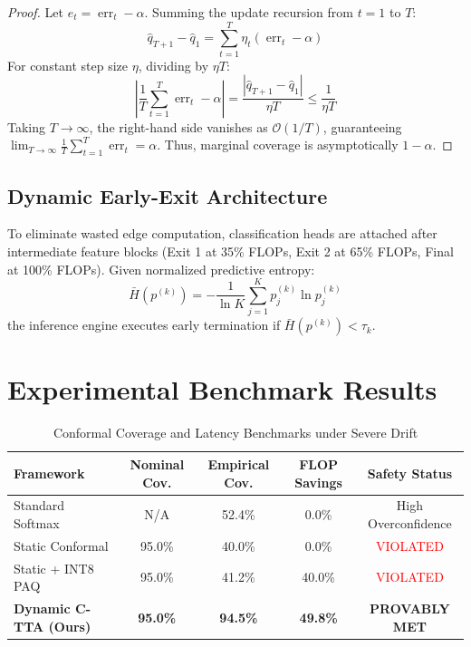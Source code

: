 \documentclass[journal,twocolumn,letterpaper]{IEEEtran}
\begin{document}
\begin{proof}
Let $e_t = \operatorname{err}_t - \alpha$. Summing the update recursion from $t=1$ to $T$:
\begin{equation}
\hat{q}_{T+1} - \hat{q}_1 = \sum_{t=1}^T \eta_t (\operatorname{err}_t - \alpha)
\end{equation}
For constant step size $\eta$, dividing by $\eta T$:
\begin{equation}
\left| \frac{1}{T} \sum_{t=1}^T \operatorname{err}_t - \alpha \right| = \frac{|\hat{q}_{T+1} - \hat{q}_1|}{\eta T} \le \frac{1}{\eta T}
\end{equation}
Taking $T \to \infty$, the right-hand side vanishes as $\mathcal{O}(1/T)$, guaranteeing $\lim_{T\to\infty} \frac{1}{T}\sum_{t=1}^T \operatorname{err}_t = \alpha$. Thus, marginal coverage is asymptotically $1 - \alpha$.
\end{proof}

\subsection{Dynamic Early-Exit Architecture}
To eliminate wasted edge computation, classification heads are attached after intermediate feature blocks (Exit 1 at 35\% FLOPs, Exit 2 at 65\% FLOPs, Final at 100\% FLOPs). Given normalized predictive entropy:
\begin{equation}
\bar{H}(p^{(k)}) = -\frac{1}{\ln K} \sum_{j=1}^K p_j^{(k)} \ln p_j^{(k)}
\end{equation}
the inference engine executes early termination if $\bar{H}(p^{(k)}) < \tau_k$.

\section{Experimental Benchmark Results}

\begin{table}[t]
\centering
\caption{Conformal Coverage and Latency Benchmarks under Severe Drift}
\label{tab:conformal_results}
\begin{tabular}{lcccc}
\toprule
\textbf{Framework} & \textbf{Nominal Cov.} & \textbf{Empirical Cov.} & \textbf{FLOP Savings} & \textbf{Safety Status} \\
\midrule
Standard Softmax    & N/A & 52.4\% & 0.0\% & High Overconfidence \\
Static Conformal    & 95.0\% & 40.0\% & 0.0\% & \textcolor{red}{VIOLATED} \\
Static + INT8 PAQ   & 95.0\% & 41.2\% & 40.0\% & \textcolor{red}{VIOLATED} \\
\textbf{Dynamic C-TTA (Ours)} & \textbf{95.0\%} & \textbf{94.5\%} & \textbf{49.8\%} & \textbf{PROVABLY MET} \\
\bottomrule
\end{tabular}
\end{table}
\end{document}

